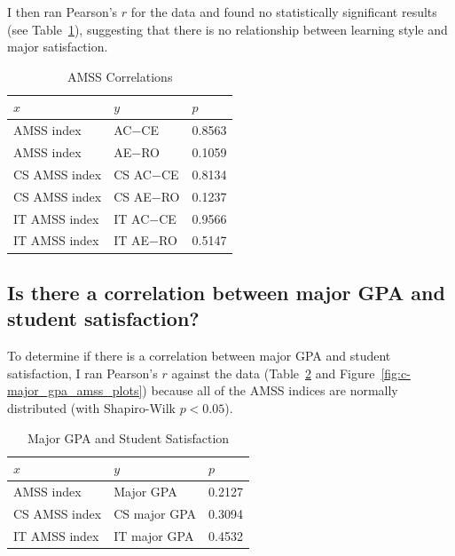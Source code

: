 I then ran Pearson's $r$ for the data and found no statistically significant results (see Table~\ref{tab:c-amss_corr}), suggesting that there is no relationship between learning style and major satisfaction.

\begin{table}[!hbtp]
  \centering
  \caption{AMSS Correlations}
  \label{tab:c-amss_corr}
  \begin{tabular}{lll}
    \toprule
    $x$           & $y$        & $p$ \\
    \midrule
    AMSS index    & AC$-$CE    & 0.8563 \\
    AMSS index    & AE$-$RO    & 0.1059 \\
    CS AMSS index & CS AC$-$CE & 0.8134 \\
    CS AMSS index & CS AE$-$RO & 0.1237 \\
    IT AMSS index & IT AC$-$CE & 0.9566 \\
    IT AMSS index & IT AE$-$RO & 0.5147 \\
    \bottomrule
  \end{tabular}
\end{table}

\subsection{Is there a correlation between major GPA and student satisfaction?}
To determine if there is a correlation between major GPA and student satisfaction, I ran Pearson's $r$ against the data (Table~\ref{tab:c-satisfaction} and Figure~\ref{fig:c-major_gpa_amss_plots}) because all of the AMSS indices are normally distributed (with Shapiro-Wilk $p<0.05$).

\begin{table}[!htbp]
  \centering
  \caption{Major GPA and Student Satisfaction}
  \label{tab:c-satisfaction}
  \begin{tabular}{lll}
    \toprule
    $x$           & $y$          & $p$ \\
    \midrule
    AMSS index    & Major GPA    & 0.2127 \\
    CS AMSS index & CS major GPA & 0.3094 \\
    IT AMSS index & IT major GPA & 0.4532 \\
    \bottomrule
  \end{tabular}
\end{table}

